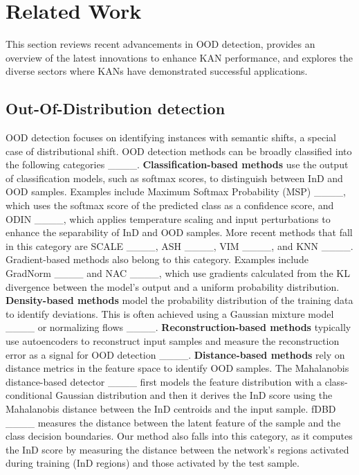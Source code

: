\section{Related Work}
This section reviews recent advancements in OOD detection, provides an overview of the latest innovations to enhance KAN performance, and explores the diverse sectors where KANs have demonstrated successful applications.

\subsection{Out-Of-Distribution detection}
OOD detection focuses on identifying instances with semantic shifts, a special case of distributional shift.  
OOD detection methods can be broadly classified into the following categories ____. 
\textbf{Classification-based methods} use the output of classification models, such as softmax scores, to distinguish between InD and OOD samples. Examples include Maximum Softmax Probability (MSP) ____, which uses the softmax score of the predicted class as a confidence score, and ODIN ____, which applies temperature scaling and input perturbations to enhance the separability of InD and OOD samples. 
More recent methods that fall in this category are SCALE ____, ASH ____, VIM ____, and KNN ____. 
Gradient-based methods also belong to this category. 
Examples include GradNorm ____ and NAC ____, which use gradients calculated from the KL divergence between the model's output and a uniform probability distribution.
\textbf{Density-based methods} model the probability distribution of the training data to identify deviations. 
This is often achieved using a Gaussian mixture model ____ or normalizing flows ____.
\textbf{Reconstruction-based methods} typically use autoencoders to reconstruct input samples and measure the reconstruction error as a signal for OOD detection ____.
\textbf{Distance-based methods} rely on distance metrics in the feature space to identify OOD samples. 
The Mahalanobis distance-based detector ____ first models the feature distribution with a class-conditional Gaussian distribution and then it derives the InD score using the Mahalanobis distance between the InD centroids and the input sample. 
fDBD ____ measures the distance between the latent feature of the sample and the class decision boundaries. 
Our method also falls into this category, as it computes the InD score by measuring the distance between the network's regions activated during training (InD regions) and those activated by the test sample.


